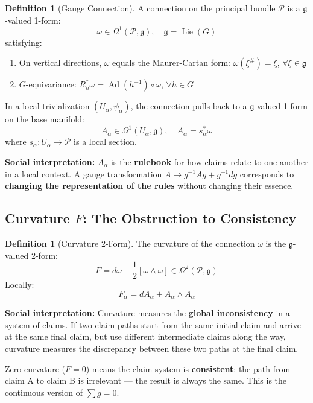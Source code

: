 \documentclass[12pt,a4paper]{article}
\theoremstyle{plain}
\theoremstyle{definition}
\newtheorem{definition}[theorem]{Definition}
\newcommand{\Pcal}{\mathcal{P}}
\newcommand{\Lie}{\mathfrak{g}}
\newcommand{\curv}{F}
\newcommand{\conn}{\omega}
\DeclareMathOperator{\Ad}{Ad}
\begin{document}
\begin{definition}[Gauge Connection]
A connection on the principal bundle $\Pcal$ is a $\Lie$-valued 1-form:
\begin{equation}
    \conn \in \Omega^1(\Pcal, \Lie), \quad \Lie = \operatorname{Lie}(G)
\end{equation}
satisfying:
\begin{enumerate}[label=(\roman*)]
    \item On vertical directions, $\conn$ equals the Maurer-Cartan form: $\conn(\xi^\#) = \xi$, $\forall \xi \in \Lie$
    \item $G$-equivariance: $R_h^* \conn = \Ad(h^{-1}) \circ \conn$, $\forall h \in G$
\end{enumerate}

In a local trivialization $(U_\alpha, \psi_\alpha)$, the connection pulls back to a $\Lie$-valued 1-form on the base manifold:
\begin{equation}
    A_\alpha \in \Omega^1(U_\alpha, \Lie), \quad A_\alpha = s_\alpha^* \conn
\end{equation}
where $s_\alpha: U_\alpha \to \Pcal$ is a local section.

\textbf{Social interpretation:} $A_\alpha$ is the \textbf{rulebook} for how claims relate to one another in a local context.
A gauge transformation $A \mapsto g^{-1}Ag + g^{-1}dg$ corresponds to \textbf{changing the representation of the rules} without changing their essence.
\end{definition}

\subsection{Curvature $\curv$: The Obstruction to Consistency}

\begin{definition}[Curvature 2-Form]
The curvature of the connection $\conn$ is the $\Lie$-valued 2-form:
\begin{equation}
    \curv = d\conn + \frac{1}{2}[\conn \wedge \conn] \in \Omega^2(\Pcal, \Lie)
\end{equation}
Locally:
\begin{equation}
    F_\alpha = dA_\alpha + A_\alpha \wedge A_\alpha
\end{equation}

\textbf{Social interpretation:} Curvature measures the \textbf{global inconsistency} in a system of claims.
If two claim paths start from the same initial claim and arrive at the same final claim, but use different intermediate claims along the way, curvature measures the discrepancy between these two paths at the final claim.

Zero curvature ($F = 0$) means the claim system is \textbf{consistent}: the path from claim A to claim B is irrelevant — the result is always the same. This is the continuous version of $\sum g = 0$.
\end{definition}
\end{document}
